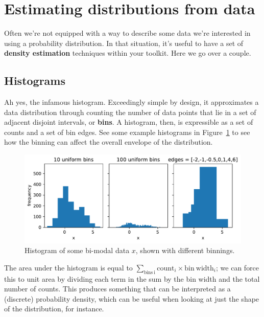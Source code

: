 \documentclass[
  11pt,
  numbers=noendperiod]{book}
\begin{document}
\hypertarget{estimating-distributions-from-data}{%
\section{Estimating distributions from
data}\label{estimating-distributions-from-data}}

Often we're not equipped with a way to describe some data we're
interested in using a probability distribution. In that situation, it's
useful to have a set of \textbf{density estimation} techniques within
your toolkit. Here we go over a couple.

\hypertarget{sec-hists}{%
\subsection{Histograms}\label{sec-hists}}

Ah yes, the infamous histogram. Exceedingly simple by design, it
approximates a data distribution through counting the number of data
points that lie in a set of adjacent disjoint intervals, or
\textbf{bins}. A histogram, then, is expressible as a set of counts and
a set of bin edges. See some example histograms in Figure~\ref{fig-hist}
to see how the binning can affect the overall envelope of the
distribution.

\begin{figure}

{\centering \includegraphics{./stat-practical_files/figure-pdf/fig-hist-output-1.pdf}

}

\caption{\label{fig-hist}Histogram of some bi-modal data \(x\), shown
with different binnings.}

\end{figure}

The area under the histogram is equal to
\(\sum_{\mathrm{bins~i}} \mathrm{count}_i \times \mathrm{bin~width}_i\);
we can force this to unit area by dividing each term in the sum by the
bin width and the total number of counts. This produces something that
can be interpreted as a (discrete) probability density, which can be
useful when looking at just the shape of the distribution, for instance.
\end{document}
